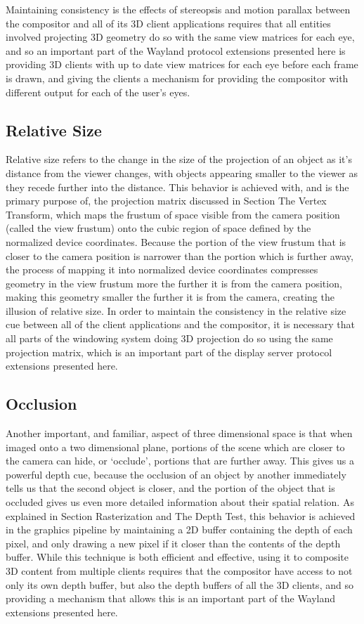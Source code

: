 Maintaining consistency is the effects of stereopsis and motion parallax between the compositor and all of its 3D client applications requires that all entities involved projecting 3D geometry do so with the same view matrices for each eye, and so an important part of the Wayland protocol extensions presented here is providing 3D clients with up to date view matrices for each eye before each frame is drawn, and giving the clients a mechanism for providing the compositor with different output for each of the user’s eyes.

\subsection{Relative Size}

Relative size refers to the change in the size of the projection of an object as it’s distance from the viewer changes, with objects appearing smaller to the viewer as they recede further into the distance. This behavior is achieved with, and is the primary purpose of, the projection matrix discussed in Section {The Vertex Transform}, which maps the frustum of space visible from the camera position (called the view frustum) onto the cubic region of space defined by the normalized device coordinates. Because the portion of the view frustum that is closer to the camera position is narrower than the portion which is further away, the process of mapping it into normalized device coordinates compresses geometry in the view frustum more the further it is from the camera position, making this geometry smaller the further it is from the camera, creating the illusion of relative size. In order to maintain the consistency in the relative size cue between all of the client applications and the compositor, it is necessary that all parts of the windowing system doing 3D projection do so using the same projection matrix, which is an important part of the display server protocol extensions presented here.

\subsection{Occlusion}

Another important, and familiar, aspect of three dimensional space is that when imaged onto a two dimensional plane, portions of the scene which are closer to the camera can hide, or ‘occlude’, portions that are further away. This gives us a powerful depth cue, because the occlusion of an object by another immediately tells us that the second object is closer, and the portion of the object that is occluded gives us even more detailed information about their spatial relation. As explained in Section {Rasterization and The Depth Test}, this behavior is achieved in the graphics pipeline by maintaining a 2D buffer containing the depth of each pixel, and only drawing a new pixel if it closer than the contents of the depth buffer. While this technique is both efficient and effective, using it to composite 3D content from multiple clients requires that the compositor have access to not only its own depth buffer, but also the depth buffers of all the 3D clients, and so providing a mechanism that allows this is an important part of the Wayland extensions presented here. 

